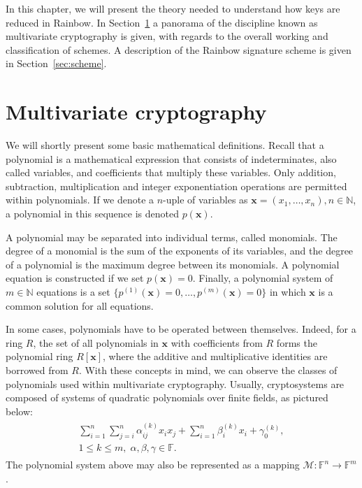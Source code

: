 \documentclass[openright, draft, 10pt]{report}
\begin{document}
In this chapter, we will present the theory needed to understand how keys are reduced in Rainbow. In Section~\ref{sec:mult} a panorama of the discipline known as multivariate cryptography is given, with regards to the overall working and classification of schemes. A description of the Rainbow signature scheme is given in Section~\ref{sec:scheme}. 


\section{Multivariate cryptography}\label{sec:mult}

We will shortly present some basic mathematical definitions. Recall that a polynomial is a mathematical expression that consists of indeterminates, also called variables, and coefficients that multiply these variables. Only addition, subtraction, multiplication and integer exponentiation operations are permitted within polynomials. If we denote a $n$-uple of variables as $\mathbf{x} = (x_{1}, \dots, x_{n}), n \in \mathbb{N}$, a polynomial in this sequence is denoted $p(\mathbf{x})$. 

A polynomial may be separated into individual terms, called monomials. The degree of a monomial is the sum of the exponents of its variables, and the degree of a polynomial is the maximum degree between its monomials. A polynomial equation is constructed if we set $p(\mathbf{x}) = 0$. Finally, a polynomial system of $m \in \mathbb{N}$ equations is a set $\{p^{(1)}(\mathbf{x}) = 0, \dots, p^{(m)}(\mathbf{x}) = 0\}$ in which $\mathbf{x}$ is a common solution for all equations.

In some cases, polynomials have to be operated between themselves. Indeed, for a ring $R$, the set of all polynomials in $\mathbf{x}$ with coefficients from $R$ forms the polynomial ring $R[\mathbf{x}]$, where the additive and multiplicative identities are borrowed from $R$. With these concepts in mind, we can observe the classes of polynomials used within multivariate cryptography. Usually, cryptosystems are composed of systems of quadratic polynomials over finite fields, as pictured below:
\begin{align}
    \begin{split}
        \sum_{i = 1}^{n} \sum_{j = i}^{n} \alpha_{ij}^{(k)} x_{i} x_{j} + \sum_{i = 1}^{n} \beta_{i}^{(k)} x_{i} + \gamma_{0}^{(k)}, \\
        1 \leq k \leq m, \; \alpha, \beta, \gamma \in \mathbb{F}.
    \end{split}
\end{align}
The polynomial system above may also be represented as a mapping $\mathcal{M}: \mathbb{F}^{n} \to \mathbb{F}^{m}$.
\end{document}
